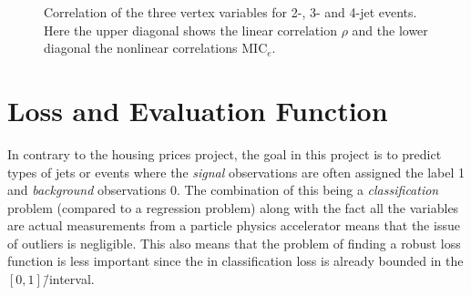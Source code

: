 \begin{figure}%
  \centering
  \caption[Correlation of Vertex Variables]{Correlation of the three vertex variables for 2-, 3- and 4-jet events. Here the upper diagonal shows the linear correlation $\rho$ and the lower diagonal the nonlinear correlations $\mathrm{MIC}_e$.}%
  \label{fig:q:correlation_vertex_all}%
\end{figure}

\FloatBarrier
\section{Loss and Evaluation Function}
\label{sec:q:loss_evaluation_function}

In contrary to the housing prices project, the goal in this project is to predict types of jets or events where the \emph{signal} observations are often assigned the label \num{1} and \emph{background} observations \num{0}. 
The combination of this being a \emph{classification} problem (compared to a regression problem) along with the fact all the variables are actual measurements from a particle physics accelerator means that the issue of outliers is negligible. This also means that the problem of finding a robust loss function is less important since the in classification loss is already bounded in the $[0, 1]$\=/interval. 

